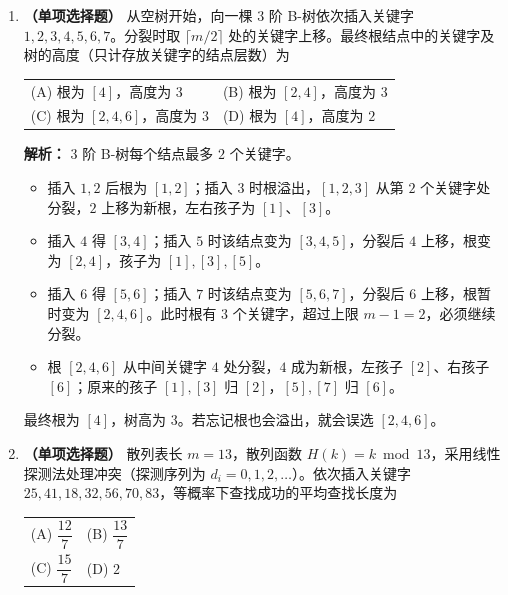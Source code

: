 \begin{enumerate}
\vspace{6pt}

\item \textbf{（单项选择题）} 从空树开始，向一棵 $3$ 阶 B-树依次插入关键字 $1,2,3,4,5,6,7$。分裂时取 $\lceil m/2\rceil$ 处的关键字上移。最终根结点中的关键字及树的高度（只计存放关键字的结点层数）为
\begin{center}
\begin{tabular}{ll}
(A) 根为 $[4]$，高度为 $3$ & (B) 根为 $[2,4]$，高度为 $3$ \\[6pt]
(C) 根为 $[2,4,6]$，高度为 $3$ & (D) 根为 $[4]$，高度为 $2$
\end{tabular}
\end{center}

\ifshowsolutions\par\noindent\textbf{解析：} $3$ 阶 B-树每个结点最多 $2$ 个关键字。
\begin{itemize}
    \item 插入 $1,2$ 后根为 $[1,2]$；插入 $3$ 时根溢出，$[1,2,3]$ 从第 $2$ 个关键字处分裂，$2$ 上移为新根，左右孩子为 $[1]$、$[3]$。
    \item 插入 $4$ 得 $[3,4]$；插入 $5$ 时该结点变为 $[3,4,5]$，分裂后 $4$ 上移，根变为 $[2,4]$，孩子为 $[1],[3],[5]$。
    \item 插入 $6$ 得 $[5,6]$；插入 $7$ 时该结点变为 $[5,6,7]$，分裂后 $6$ 上移，根暂时变为 $[2,4,6]$。此时根有 $3$ 个关键字，超过上限 $m-1=2$，必须继续分裂。
    \item 根 $[2,4,6]$ 从中间关键字 $4$ 处分裂，$4$ 成为新根，左孩子 $[2]$、右孩子 $[6]$；原来的孩子 $[1],[3]$ 归 $[2]$，$[5],[7]$ 归 $[6]$。
\end{itemize}
最终根为 $[4]$，树高为 $3$。若忘记根也会溢出，就会误选 $[2,4,6]$。
\par\noindent{}\else \answerarea \fi

\vspace{6pt}

\ifshowsolutions\newpage\fi
\item \textbf{（单项选择题）} 散列表长 $m=13$，散列函数 $H(k)=k\bmod 13$，采用线性探测法处理冲突（探测序列为 $d_i=0,1,2,\ldots$）。依次插入关键字 $25,41,18,32,56,70,83$，等概率下查找成功的平均查找长度为
\begin{center}
\begin{tabular}{ll}
(A) $\dfrac{12}{7}$ & (B) $\dfrac{13}{7}$ \\[8pt]
(C) $\dfrac{15}{7}$ & (D) $2$
\end{tabular}
\end{center}


\end{enumerate}
